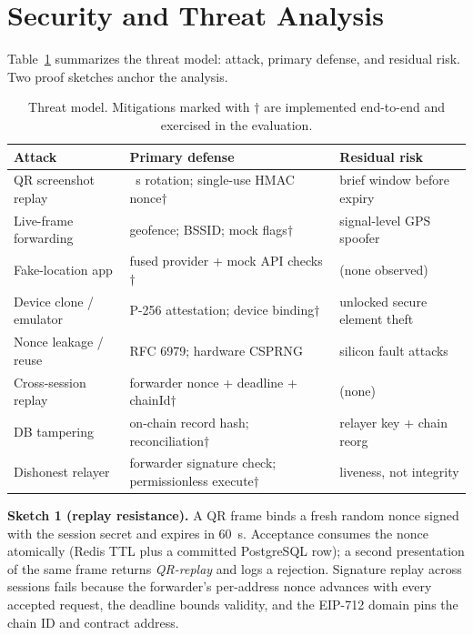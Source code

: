 \documentclass[conference]{IEEEtran}
\begin{document}
\section{Security and Threat Analysis}
Table~\ref{tab:threat} summarizes the threat model: attack, primary defense,
and residual risk. Two proof sketches anchor the analysis.

\begin{table}[t]
\footnotesize
\centering
\caption{Threat model. Mitigations marked with $\dagger$ are implemented
end-to-end and exercised in the evaluation.}
\label{tab:threat}
\begin{tabular}{@{}>{\raggedright\arraybackslash}p{2.1cm}>{\raggedright\arraybackslash}p{3.7cm}>{\raggedright\arraybackslash}p{2.2cm}@{}}
\toprule
\textbf{Attack} & \textbf{Primary defense} & \textbf{Residual risk} \\
\midrule
QR screenshot replay & 45~s rotation; single-use HMAC nonce$\dagger$ & brief window before expiry \\
Live-frame forwarding & geofence; BSSID; mock flags$\dagger$ & signal-level GPS spoofer \\
Fake-location app & fused provider + mock API checks$\dagger$ & (none observed) \\
Device clone / emulator & P-256 attestation; device binding$\dagger$ & unlocked secure element theft \\
Nonce leakage / reuse & RFC 6979; hardware CSPRNG & silicon fault attacks \\
Cross-session replay & forwarder nonce + deadline + chainId$\dagger$ & (none) \\
DB tampering & on-chain record hash; reconciliation$\dagger$ & relayer key + chain reorg \\
Dishonest relayer & forwarder signature check; permissionless execute$\dagger$ & liveness, not integrity \\
\bottomrule
\end{tabular}
\end{table}

\noindent\textbf{Sketch 1 (replay resistance).} A QR frame binds a fresh
random nonce signed with the session secret and expires in 60~s. Acceptance
consumes the nonce atomically (Redis TTL plus a committed PostgreSQL row);
a second presentation of the same frame returns \emph{QR-replay} and logs a
rejection. Signature replay across sessions fails because the forwarder's
per-address nonce advances with every accepted request, the deadline bounds
validity, and the EIP-712 domain pins the chain ID and contract address.
\end{document}
